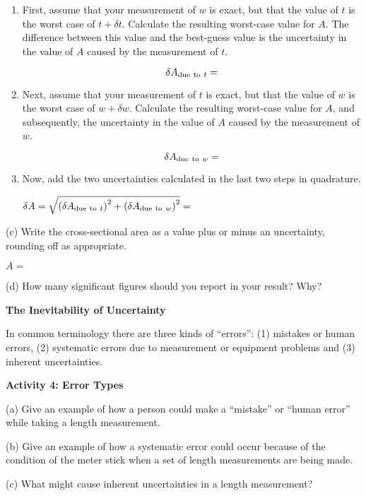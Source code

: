 \begin {enumerate}
\item  First, assume that your measurement of $w$  is exact, but that the value of $t$  is the worst case of $t + \delta t$. Calculate the resulting worst-case value for $A$. The difference between this value and the best-guess value is the uncertainty in the value of $A$ caused by the measurement of $t$. 

\vspace {20mm}
$$
\delta A_{ {\rm due~ to~} t} =
$$

\item  Next, assume that your measurement of $t$ is exact, but that the value of $w$ is the worst case of $w+ \delta w$. Calculate the resulting worst-case value for $A$, and subsequently, the uncertainty in the value of $A$ caused by the measurement of $w$.

\vspace {20mm}
$$
\delta A_{ {\rm due~ to~} w}=
$$

\newpage
\item Now, add the two uncertainties calculated in the last two steps in quadrature.

\vspace{4mm}
\hspace {5mm} $\delta A = \sqrt{ \left(\delta A_{{\rm due~ to~} t}\right)^2 + \left(\delta A_{{\rm due~ to~} w}\right)^2 } =$

\end {enumerate}



\vspace{15mm}

(c) Write the cross-sectional area as a value plus or minus an uncertainty, rounding off as appropriate.

\vspace{4mm}
\hspace {30mm} $A =$
\vspace{3mm}


(d) How many significant figures should you report in your result? Why?
\vspace{25mm}

\textbf{The Inevitability of Uncertainty} 

In common terminology there are three kinds of ``errors'': (1)
mistakes or human errors, (2) systematic errors due to measurement or equipment
problems and (3) inherent uncertainties.

\textbf{Activity 4: Error Types} 

(a) Give an example of how a person could make a ``mistake''
or ``human error'' while taking a length measurement.
\vspace{15mm}

(b) Give an example of how a systematic error could occur because of the condition
of the meter stick when a set of length measurements are being made.
\vspace{20mm}

(c) What might cause inherent uncertainties in a length measurement?

